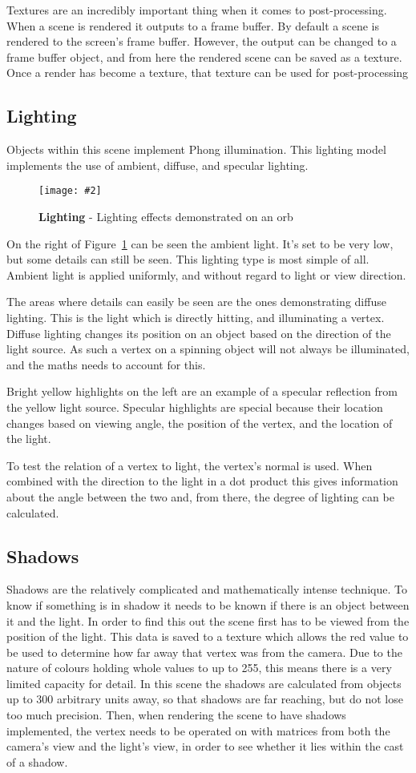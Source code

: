 \documentclass[10pt, a4paper]{article}
\newcommand{\figuremacro}[5]{
    \begin{figure}[#1]
        \centering
        \texttt{[image: \#2]}
        \caption[#3]{\textbf{#3}#4}
        \label{fig:#2}
    \end{figure}
}
\begin{document}
	Textures are an incredibly important thing when it comes to post-processing.  When a scene is rendered it outputs to a frame buffer.  By default a scene is rendered to the screen's frame buffer.  However, the output can be changed to a frame buffer object, and from here the rendered scene can be saved as a texture.  Once a render has become a texture, that texture can be used for post-processing
	\subsection{Lighting}
	Objects within this scene implement Phong illumination.  This lighting model implements the use of ambient, diffuse, and specular lighting.
	\figuremacro{h}{Phong_demo}{Lighting}{ - Lighting effects demonstrated on an orb}{1.0}
	
	On the right of Figure~\ref{fig:Phong_demo} can be seen the ambient light.  It's set to be very low, but some details can still be seen.  This lighting type is most simple of all.  Ambient light is applied uniformly, and without regard to light or view direction.
	
	The areas where details can easily be seen are the ones demonstrating diffuse lighting.  This is the light which is directly hitting, and illuminating a vertex.  Diffuse lighting changes its position on an object based on the direction of the light source.  As such a vertex on a spinning object will not always be illuminated, and the maths needs to account for this.
	
	Bright yellow highlights on the left are an example of a specular reflection from the yellow light source.  Specular highlights are special because their location changes based on viewing angle, the position of the vertex, and the location of the light.
	
	To test the relation of a vertex to light, the vertex's normal is used.  When combined with the direction to the light in a dot product this gives information about the angle between the two and, from there, the degree of lighting can be calculated.
	\subsection{Shadows}
	Shadows are the relatively complicated and mathematically intense technique.  To know if something is in shadow it needs to be known if there is an object between it and the light.  In order to find this out the scene first has to be viewed from the position of the light.  This data is saved to a texture which allows the red value to be used to determine how far away that vertex was from the camera.  Due to the nature of colours holding whole values to up to 255, this means there is a very limited capacity for detail.  In this scene the shadows are calculated from objects up to 300 arbitrary units away, so that shadows are far reaching, but do not lose too much precision.  Then, when rendering the scene to have shadows implemented, the vertex needs to be operated on with matrices from both the camera's view and the light's view, in order to see whether it lies within the cast of a shadow.
	
\end{document}
